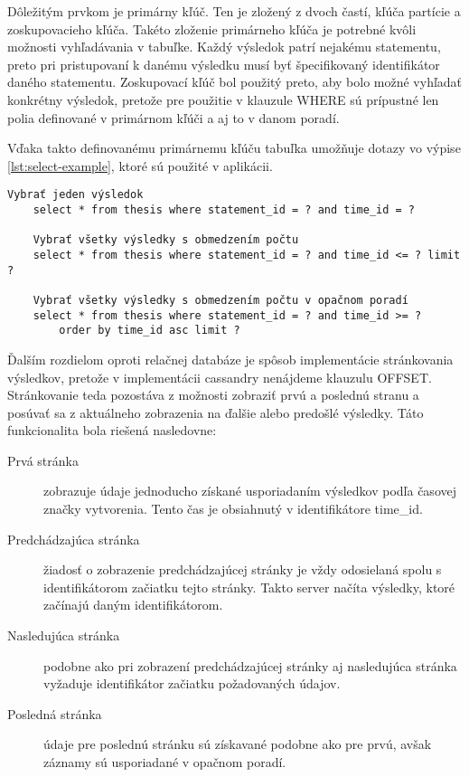 		Dôležitým prvkom je primárny kľúč. Ten je zložený z dvoch častí, kľúča partície a zoskupovacieho kľúča. Takéto zloženie primárneho kľúča je potrebné kvôli možnosti vyhľadávania v tabuľke. Každý výsledok patrí nejakému statementu, preto pri pristupovaní k danému výsledku musí byť špecifikovaný identifikátor daného statementu. Zoskupovací kľúč bol použitý preto, aby bolo možné vyhľadať konkrétny výsledok, pretože pre použitie v klauzule WHERE sú prípustné len polia definované v primárnom kľúči a aj to v danom poradí.
		
		Vďaka takto definovanému primárnemu kľúču tabuľka umožňuje dotazy vo výpise \ref{lst:select-example}, ktoré sú použité v aplikácii.
		\begin{lstlisting}[label=lst:select-example,caption=Príklad statementov vyhovujúcich definovanému primárnemu kľúču]
	Vybrať jeden výsledok
	select * from thesis where statement_id = ? and time_id = ?
			
	Vybrať všetky výsledky s obmedzením počtu
	select * from thesis where statement_id = ? and time_id <= ? limit ?
			
	Vybrať všetky výsledky s obmedzením počtu v opačnom poradí
	select * from thesis where statement_id = ? and time_id >= ?
		order by time_id asc limit ?
		\end{lstlisting}
		
		Ďalším rozdielom oproti relačnej databáze je spôsob implementácie stránkovania výsledkov, pretože v implementácii cassandry nenájdeme klauzulu OFFSET. Stránkovanie teda pozostáva z možnosti zobraziť prvú a poslednú stranu a posúvať sa z aktuálneho zobrazenia na ďalšie alebo predošlé výsledky. Táto funkcionalita bola riešená nasledovne: \cite{pagination}
		\begin{description}
			\item[Prvá stránka] zobrazuje údaje jednoducho získané usporiadaním výsledkov podľa časovej značky vytvorenia. Tento čas je obsiahnutý v identifikátore time\_id.
			\item[Predchádzajúca stránka] žiadosť o zobrazenie predchádzajúcej stránky je vždy odosielaná spolu s identifikátorom začiatku tejto stránky. Takto server načíta výsledky, ktoré začínajú daným identifikátorom.
			\item[Nasledujúca stránka] podobne ako pri zobrazení predchádzajúcej stránky aj nasledujúca stránka vyžaduje identifikátor začiatku požadovaných údajov.
			\item[Posledná stránka] údaje pre poslednú stránku sú získavané podobne ako pre prvú, avšak záznamy sú usporiadané v opačnom poradí.
		\end{description}
		
